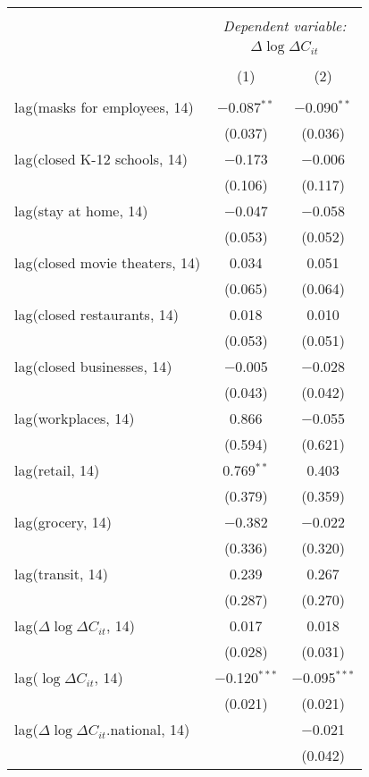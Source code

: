 \begin{tabular}{@{\extracolsep{1pt}}lcc} 
\\[-1.8ex]\hline 
\hline \\[-1.8ex] 
 & \multicolumn{2}{c}{\textit{Dependent variable:}} \\ 
\cline{2-3} 
 & \multicolumn{2}{c}{$\Delta \log \Delta C_{it}$} \\ 
\\[-1.8ex] & (1) & (2)\\ 
\hline \\[-1.8ex] 
 lag(masks for employees, 14) & $-$0.087$^{**}$ & $-$0.090$^{**}$ \\ 
  & (0.037) & (0.036) \\ 
  lag(closed K-12 schools, 14) & $-$0.173 & $-$0.006 \\ 
  & (0.106) & (0.117) \\ 
  lag(stay at home, 14) & $-$0.047 & $-$0.058 \\ 
  & (0.053) & (0.052) \\ 
  lag(closed movie theaters, 14) & 0.034 & 0.051 \\ 
  & (0.065) & (0.064) \\ 
  lag(closed restaurants, 14) & 0.018 & 0.010 \\ 
  & (0.053) & (0.051) \\ 
  lag(closed businesses, 14) & $-$0.005 & $-$0.028 \\ 
  & (0.043) & (0.042) \\ 
  lag(workplaces, 14) & 0.866 & $-$0.055 \\ 
  & (0.594) & (0.621) \\ 
  lag(retail, 14) & 0.769$^{**}$ & 0.403 \\ 
  & (0.379) & (0.359) \\ 
  lag(grocery, 14) & $-$0.382 & $-$0.022 \\ 
  & (0.336) & (0.320) \\ 
  lag(transit, 14) & 0.239 & 0.267 \\ 
  & (0.287) & (0.270) \\ 
  lag($\Delta \log \Delta C_{it}$, 14) & 0.017 & 0.018 \\ 
  & (0.028) & (0.031) \\ 
  lag($\log \Delta C_{it}$, 14) & $-$0.120$^{***}$ & $-$0.095$^{***}$ \\ 
  & (0.021) & (0.021) \\ 
  lag($\Delta \log \Delta C_{it}$.national, 14) &  & $-$0.021 \\ 
  &  & (0.042) \\ 

\end{tabular}
